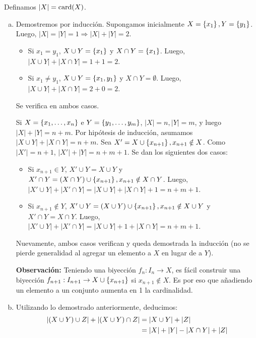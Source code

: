 
Definamos $|X| = \operatorname{card}(X)$.

\begin{enumerate}[a)]

	\item Demostremos por inducción.
		Supongamos inicialmente $X=\left\{x_1\right\}, Y=\left\{y_1\right\}$. Luego, $|X| = |Y| = 1 \Rightarrow |X| + |Y| = 2$.
		\begin{itemize}
			\item Si $x_1 = y_1$, $X\cup Y = \left\{x_1\right\}$ y $X\cap Y = \left\{x_1\right\}$. Luego, $|X\cup Y| + |X\cap Y| = 1 + 1 = 2$.
			\item Si $x_1 \neq y_1$, $X\cup Y = \left\{x_1,y_1\right\}$ y $X\cap Y = \emptyset$. Luego, $|X\cup Y| + |X\cap Y| = 2 + 0 = 2$.
		\end{itemize}
		Se verifica en ambos casos.

		Si $X = \left\{x_1,\ldots,x_n\right\}$ e $Y = \left\{y_1,\ldots,y_m\right\}$, $|X|=n, |Y|=m$, y luego $|X| + |Y| = n + m$. Por hipótesis de inducción, asumamos $|X\cup Y| + |X\cap Y| = n + m$.
		Sea $X' = X\cup \left\{x_{n+1}\right\},x_{n+1}\notin X$. Como $|X'| = n+1$, $|X'| + |Y| = n + m + 1$. Se dan los siguientes dos casos:
		\begin{itemize}
			\item Si $x_{n+1}\in Y$, $X'\cup Y = X \cup Y$ y $X'\cap Y = (X\cap Y) \cup \left\{x_{n+1}\right\}, x_{n+1}\notin X\cap Y$.
				Luego, $|X'\cup Y| + |X'\cap Y| = |X\cup Y| + |X\cap Y| + 1 = n + m + 1$.
			\item Si $x_{n+1}\notin Y$, $X'\cup Y = (X\cup Y) \cup \left\{x_{n+1}\right\}, x_{n+1}\notin X\cup Y$ y $X'\cap Y = X \cap Y$.
				Luego, $|X'\cup Y| + |X'\cap Y| = |X\cup Y| + 1 + |X\cap Y| = n + m + 1$.
		\end{itemize}
		Nuevamente, ambos casos verifican y queda demostrada la inducción (no se pierde generalidad al agregar un elemento a $X$ en lugar de a $Y$).

		\textbf{Observación:} Teniendo una biyección $f_n:I_n\to X$, es fácil construir una biyección $f_{n+1}:I_{n+1}\to X\cup\left\{x_{n+1}\right\}$ si $x_{n+1}\notin X$. Es por eso que añadiendo un elemento a un conjunto aumenta en 1 la cardinalidad.

	\item Utilizando lo demostrado anteriormente, deducimos:
		\begin{align}\label{eq:2_1}
			|(X\cup Y)\cup Z| + |(X\cup Y)\cap Z|
				&= |X\cup Y| + |Z| \notag \\
				&= |X| + |Y| - |X\cap Y| + |Z|
		\end{align}


\end{enumerate}
